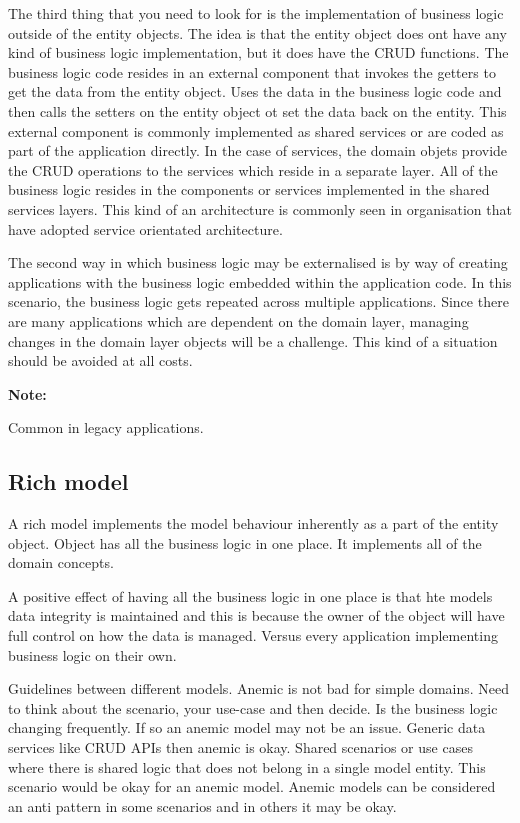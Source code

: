 \documentclass[a4paper, 11pt]{book}
\newenvironment{note}{
    \begin{siderule}
        \textbf{Note: }
        }{
    \end{siderule}
}
\begin{document}
    The third thing that you need to look for is the implementation of business logic outside of the entity objects.
    The idea is that the entity object does ont have any kind of business logic implementation, but it does have the CRUD functions.
    The business logic code resides in an external component that invokes the getters to get the data from the entity object.
    Uses the data in the business logic code and then calls the setters on the entity object ot set the data back on the entity.
    This external component is commonly implemented as shared services or are coded as part of the application directly.
    In the case of services, the domain objets provide the CRUD operations to the services which reside in a separate layer.
    All of the business logic resides in the components or services implemented in the shared services layers.
    This kind of an architecture is commonly seen in organisation that have adopted service orientated architecture.

    The second way in which business logic may be externalised is by way of creating applications with the business logic embedded within the application code.
    In this scenario, the business logic gets repeated across multiple applications.
    Since there are many applications which are dependent on the domain layer, managing changes in the domain layer objects will be a challenge.
    This kind of a situation should be avoided at all costs.

    \begin{note}
    Common in legacy applications.
    \end{note}

\subsection{Rich model}
    A rich model implements the model behaviour inherently as a part of the entity object.
    Object has all the business logic in one place.
    It implements all of the domain concepts.

    A positive effect of having all the business logic in one place is that hte models data integrity is maintained and this is because the owner of the object will have full control on how the data is managed.
    Versus every application implementing business logic on their own.

    Guidelines between different models.
    Anemic is not bad for simple domains.
    Need to think about the scenario, your use-case and then decide.
    Is the business logic changing frequently. If so an anemic model may not be an issue.
    Generic data services like CRUD APIs then anemic is okay.
    Shared scenarios or use cases where there is shared logic that does not belong in a single model entity.
    This scenario would be okay for an anemic model.
    Anemic models can be considered an anti pattern in some scenarios and in others it may be okay.
\end{document}
